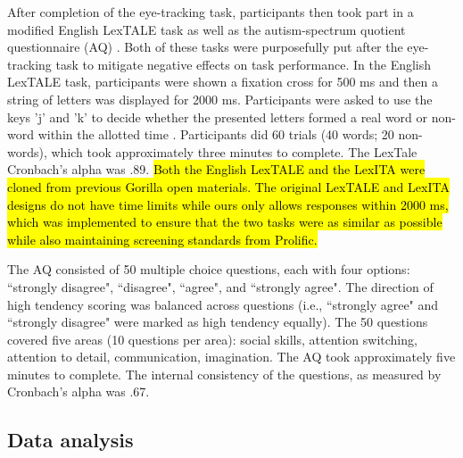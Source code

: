 After completion of the eye-tracking task, participants then took part in a modified English LexTALE \citep{lemhofer2012introducing} task as well as the autism-spectrum quotient questionnaire (AQ) \citep{Baron-Cohen2001}. Both of these tasks were purposefully put after the eye-tracking task to mitigate negative effects on task performance. In the English LexTALE task, participants were shown a fixation cross for 500 ms and then a string of letters was displayed for 2000 ms. Participants were asked to use the keys 'j' and 'k' to decide whether the presented letters formed a real word or non-word within the allotted time \cite{lemhofer2012introducing}. Participants did 60 trials (40 words; 20 non-words), which took approximately three minutes to complete. The LexTale Cronbach’s alpha was .89. \hl{Both the English LexTALE and the LexITA were cloned from previous Gorilla open materials. The original LexTALE and LexITA designs do not have time limits while ours only allows responses within 2000 ms, which was implemented to ensure that the two tasks were as similar as possible while also maintaining screening standards from Prolific.}

The AQ \citep{Baron-Cohen2001} consisted of 50 multiple choice questions, each with four options: ``strongly disagree", ``disagree", ``agree", and ``strongly agree". The direction of high tendency scoring was balanced across questions (i.e., ``strongly agree" and ``strongly disagree" were marked as high tendency equally). The 50 questions covered five areas (10 questions per area): social skills, attention switching, attention to detail, communication, imagination. The AQ took approximately five minutes to complete. The internal consistency of the questions, as measured by Cronbach’s alpha was .67.


\subsection{Data analysis}

